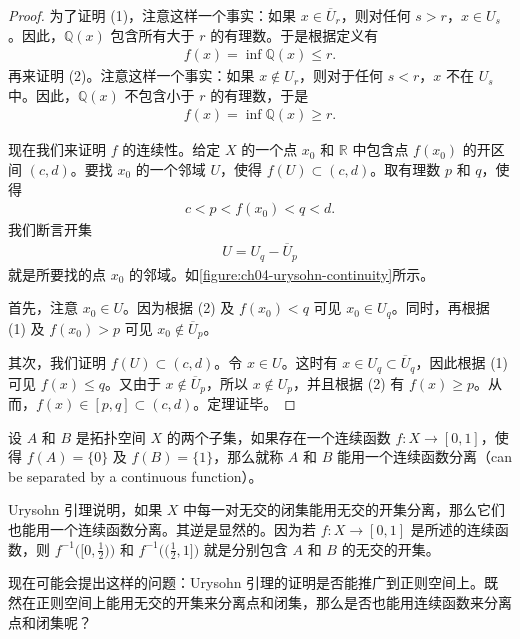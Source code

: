 \begin{proof}
为了证明 (1)，注意这样一个事实：如果 $x\in\overline{U}_{r}$，则对任何 $s>r$，$x\in U_{s}$。因此，$\mathbb{Q}(x)$ 包含所有大于 $r$ 的有理数。于是根据定义有
\begin{align*}
f(x)=\inf\mathbb{Q}(x)\leqslant r.
\end{align*}
再来证明 (2)。注意这样一个事实：如果 $x\notin U_{r}$，则对于任何 $s<r$，$x$ 不在 $U_{s}$ 中。因此，$\mathbb{Q}(x)$ 不包含小于 $r$ 的有理数，于是
\begin{align*}
f(x)=\inf\mathbb{Q}(x)\geqslant r.
\end{align*}

现在我们来证明 $f$ 的连续性。给定 $X$ 的一个点 $x_{0}$ 和 $\mathbb{R}$ 中包含点 $f(x_{0})$ 的开区间 $(c,d)$。要找 $x_{0}$ 的一个邻域 $U$，使得 $f(U)\subset(c,d)$。取有理数 $p$ 和 $q$，使得
\begin{align*}
c<p<f(x_{0})<q<d.
\end{align*}
我们断言开集
\begin{align*}
U=U_{q}-\overline{U}_{p}
\end{align*}
就是所要找的点 $x_{0}$ 的邻域。如\cref{figure:ch04-urysohn-continuity}所示。

首先，注意 $x_{0}\in U$。因为根据 (2) 及 $f(x_{0})<q$ 可见 $x_{0}\in U_{q}$。同时，再根据 (1) 及 $f(x_{0})>p$ 可见 $x_{0}\notin\overline{U}_{p}$。

其次，我们证明 $f(U)\subset(c,d)$。令 $x\in U$。这时有 $x\in U_{q}\subset\overline{U}_{q}$，因此根据 (1) 可见 $f(x)\leqslant q$。又由于 $x\notin\overline{U}_{p}$，所以 $x\notin U_{p}$，并且根据 (2) 有 $f(x)\geqslant p$。从而，$f(x)\in[p,q]\subset(c,d)$。定理证毕。
\end{proof}
\begin{definition}\label{definition:ch04-separated-by-function}
设 $A$ 和 $B$ 是拓扑空间 $X$ 的两个子集，如果存在一个连续函数 $f\colon X\to[0,1]$，使得 $f(A)=\{0\}$ 及 $f(B)=\{1\}$，那么就称 $A$ 和 $B$ 能用一个连续函数分离（can be separated by a continuous function）。
\end{definition}

Urysohn 引理说明，如果 $X$ 中每一对无交的闭集能用无交的开集分离，那么它们也能用一个连续函数分离。其逆是显然的。因为若 $f\colon X\to[0,1]$ 是所述的连续函数，则 $f^{-1}\big([0,\frac{1}{2})\big)$ 和 $f^{-1}\big((\frac{1}{2},1]\big)$ 就是分别包含 $A$ 和 $B$ 的无交的开集。

现在可能会提出这样的问题：Urysohn 引理的证明是否能推广到正则空间上。既然在正则空间上能用无交的开集来分离点和闭集，那么是否也能用连续函数来分离点和闭集呢？

